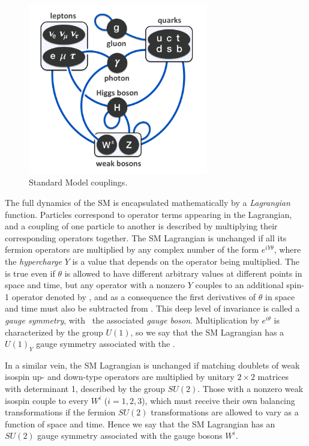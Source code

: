\documentclass[oneside, letterpaper, 12pt, oldfontcommands]{memoir}
\begin{document}
\begin{figure}[hbtp]
  \begin{center}
    \includegraphics[width=0.7\textwidth]{Figures/Elementary_particle_interactions_in_the_Standard_Model.png}
    \caption{
      Standard Model couplings.
    }
    \label{fig:sm_interactions}
  \end{center}
\end{figure}

The full dynamics of the SM is encapsulated mathematically by a \textit{Lagrangian} function. Particles correspond to operator
terms appearing in the Lagrangian, and a coupling of one particle to another is described by multiplying their
corresponding operators together. The SM Lagrangian is unchanged
if all its fermion operators are multiplied by any complex number of the form $e^{iY\theta}$, where the \textit{hypercharge} $Y$ is a value that depends
on the operator being multiplied. The is true even if $\theta$ is allowed to have different arbitrary values at
different points in space and time, but any operator with a nonzero $Y$ couples to an additional spin-1 operator denoted by \PB,
and as a consequence the first derivatives of $\theta$ in space and time must also be subtracted from \PB.
This deep level of invariance is called a \textit{gauge symmetry}, with \PB\ the associated \textit{gauge boson}.
Multiplication by $e^{i\theta}$ is characterized by the group $U(1)$, so we say that the SM Lagrangian has a
$U(1)_{Y}$ gauge symmetry associated with the \PB.

In a similar vein, the SM Lagrangian is unchanged if matching doublets
of weak isospin up- and down-type operators are multiplied by unitary $2\times2$ matrices with determinant 1, described by the
group $SU(2)$. Those with a nonzero weak isospin couple to every $W^{i}$ ($i=1,2,3$), which must receive their own balancing transformations
if the fermion $SU(2)$ transformations are allowed to vary as a function of space and time.
Hence we say that the SM Lagrangian has an $SU(2)$ gauge symmetry associated with the gauge bosons $W^{i}$.
\end{document}
